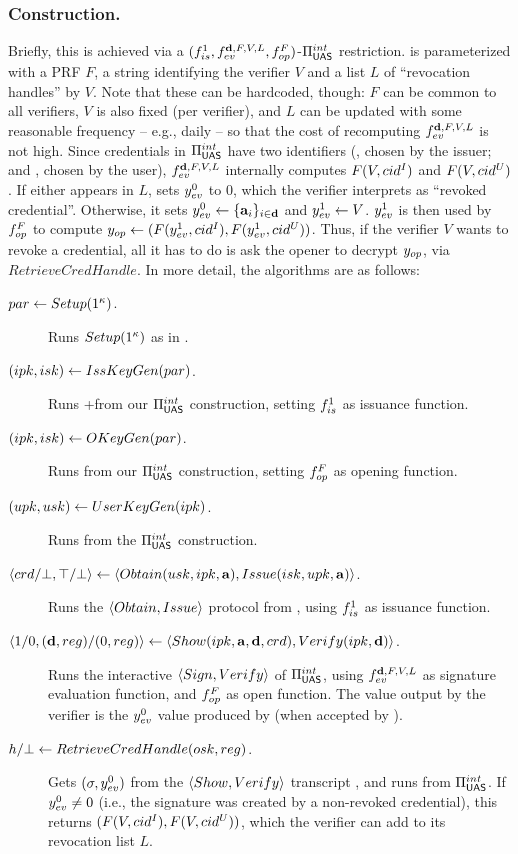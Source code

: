\subsubsection{\CUASRAC Construction.} %
Briefly, this is achieved via a $(f_{is}^1,f_{ev}^{\mathbf{d},F,V,L},
f_{op}^{F})$-$\Pi_{\mathsf{UAS}}^{int}$ restriction. \feval is parameterized with a PRF
$F$, a string identifying the verifier $V$ and a list $L$ of ``revocation
handles'' by $V$. Note that these can be hardcoded, though: $F$ can be common to
all verifiers, $V$ is also fixed (per verifier),
and $L$ can be updated with some reasonable frequency -- e.g., daily -- so that
the cost of recomputing $f_{ev}^{\mathbf{d},F,V,L}$ is not high.
%
Since credentials in $\Pi_{\mathsf{UAS}}^{int}$ have two identifiers (\cidi, chosen by the
issuer; and \cidu, chosen by the user), $f_{ev}^{\mathbf{d},F,V,L}$ internally
computes $F(V,cid^I)$ and $F(V,cid^U)$. If either appears in $L$, \feval sets
$y_{ev}^0$ to $0$, which the verifier interprets as ``revoked credential''.
Otherwise, it sets $y_{ev}^0 \gets \lbrace \mathbf{a}_i \rbrace_{i\in\mathbf{d}}$ and
$y_{ev}^1 \gets V$. $y_{ev}^1$ is
then used by $f_{op}^F$ to compute $y_{op} \gets (F(y_{ev}^1,cid^I),
F(y_{ev}^1,cid^U))$. Thus, if the verifier $V$ wants to revoke a credential, all
it has to do is ask the opener to decrypt $y_{op}$, via $RetrieveCredHandle$.
%
In more detail, the algorithms are as follows:

\begin{description}
\item[$par \gets Setup(1^\kappa)$.] Runs $Setup(1^\kappa)$ as in
  \CUASGen.
\item[$(ipk,isk) \gets IssKeyGen(par)$.] Runs \KeyGen+\ISet from our
  $\Pi_{\mathsf{UAS}}^{int}$ construction, setting $f_{is}^1$ as issuance function.
\item[$(ipk,isk) \gets OKeyGen(par)$.] Runs \OKeyGen from our
  $\Pi_{\mathsf{UAS}}^{int}$ construction, setting $f_{op}^F$ as opening function.
\item[$(upk,usk) \gets UserKeyGen(ipk)$.] Runs \KeyGen from the
  $\Pi_{\mathsf{UAS}}^{int}$ construction.
\item[$\langle crd/\bot,\top/\bot \rangle \gets
  \langle Obtain(usk,ipk,\mathbf{a}),Issue(isk,upk,\mathbf{a}) \rangle$.]
  Runs the $\langle Obtain,Issue \rangle$ protocol from \CUASGen, using
  $f_{is}^1$ as issuance function.
\item[$\langle 1/0,(\mathbf{d},reg)/(0,reg)\rangle \gets \langle Show(ipk,
  \mathbf{a},\mathbf{d},crd),
  Verify(ipk,\mathbf{d}) \rangle$.]
  Runs the interactive $\langle Sign,Verify\rangle$ of $\Pi_{\mathsf{UAS}}^{int}$,
  using $f_{ev}^{\mathbf{d},F,V,L}$ as signature evaluation function, and
  $f_{op}^F$ as open function. The \dattrs value output by the verifier is
  the $y_{ev}^0$ value produced by \Sign (when accepted by \Verify).
\item[$h/\bot \gets RetrieveCredHandle(osk,reg)$.]
  Gets $(\sigma,y_{ev}^0)$ from the $\langle Show,Verify\rangle$ transcript
  \utrans, and runs \Open from $\Pi_{\mathsf{UAS}}^{int}$. If $y_{ev}^0 \neq 0$ (i.e., the
  signature was created by a non-revoked credential), this returns $(F(V,cid^I),
  F(V,cid^U))$, which the verifier can add to its revocation list $L$.
\end{description}

